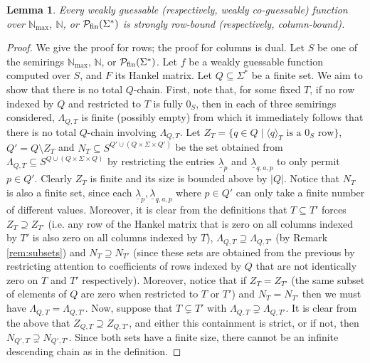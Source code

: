 \documentclass[10pt,a4paper]{amsart}
\newtheorem{lem}[thm]{Lemma}
\theoremstyle{definition}
\numberwithin{equation}{section}
\numberwithin{theorem}{section}
\begin{document}
	\begin{lem}
		\label{lemma:PM}
		Every weakly guessable (respectively, weakly co-guessable) function over $\mathbb{N}_{\max}$, $\mathbb{N}$, or $\mathcal{P}_{\rm fin}(\Sigma^*)$ is strongly row-bound (respectively, column-bound).
	\end{lem}



	\begin{proof}
	We give the proof for rows; the proof for columns is dual. Let $S$ be one of the semirings $\mathbb{N}_{\max}$, $\mathbb{N}$, or $\mathcal{P}_{\rm fin}(\Sigma^*)$.
	Let $f$ be a weakly guessable function computed over $S$, and $F$ its Hankel matrix. Let $Q \subseteq \Sigma^*$ be a finite set. We aim to show that there is no total $Q$-chain.
	First, note that, for some fixed $T$, if no row indexed by $Q$ and restricted to $T$ is fully $0_S$, then in each of three semirings considered, $\Lambda_{Q,T}$ is finite (possibly empty) from which it immediately follows that there is no total $Q$-chain involving $\Lambda_{Q,T}$. Let $Z_{T} = \{q \in Q \mid \langle q \rangle_T \mbox{ is a }0_S \mbox { row}\}$, $Q' = Q \setminus Z_{T}$ and $N_{T} \subseteq S^{Q' \cup (Q \times \Sigma \times Q')}$ be the set obtained from $\Lambda_{Q,T} \subseteq S^{Q \cup (Q \times \Sigma \times Q)}$ by restricting the entries $\underline{\lambda}_p$ and $\underline{\lambda}_{q,a,p}$ to only permit $p \in Q'$. Clearly $Z_{T}$ is finite and its size is bounded above by $|Q|$. Notice that $N_{T}$ is also a finite set, since each  $\underline{\lambda}_p, \underline{\lambda}_{q,a,p}$ where $p \in Q'$ can only take a finite number of different values. 
	Moreover, it is clear from the definitions that $T \subseteq T'$ forces $Z_{T}\supseteq Z_{T'}$ (i.e. any row of the Hankel matrix that is zero on all columns indexed by $T'$ is also zero on all columns indexed by $T$), $\Lambda_{Q, T} \supseteq \Lambda_{Q, T'}$ (by Remark \ref{rem:subsets}) and $N_{T} \supseteq N_{T'}$ (since these sets are obtained from the previous by restricting attention to coefficients of rows indexed by $Q$ that are not identically zero on $T$ and $T'$ respectively).  Moreover, notice that if $Z_{T}=Z_{T'}$ (the same subset of elements of $Q$ are zero when restricted to $T$ or $T'$) and $N_T=N_{T'}$ then we must have $\Lambda_{Q, T}=\Lambda_{Q, T'}$. Now, suppose that $T \subsetneq T'$ with  $\Lambda_{Q, T} \supsetneq \Lambda_{Q, T'}$. It is clear from the above that $Z_{Q, T}\supseteq Z_{Q, T'}$, and either this containment is strict, or if not, then $N_{Q', T} \supsetneq N_{Q', T'}$. Since both sets have a finite size, there cannot be an infinite descending chain as in the definition.
\end{proof}
\end{document}
